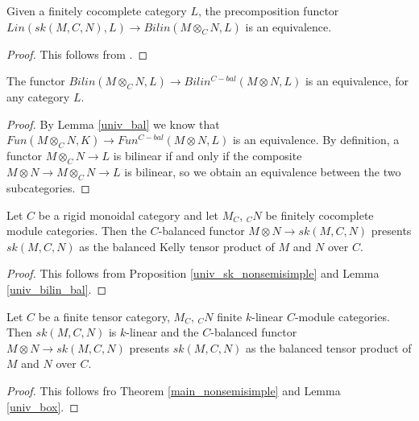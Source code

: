  
\begin{proposition}\label{univ_sk_nonsemisimple}
Given a finitely cocomplete category $L$, the precomposition functor $Lin(sk(M,C,N),L)\to Bilin(M\otimes_C N, L)$ is an equivalence.\end{proposition}
\begin{proof} This follows from \cite[Theorem 6.23]{kelly/basic-concepts-enriched}.\end{proof}

\begin{lemma}\label{univ_bilin_bal}
The functor $Bilin(M\otimes_C N,L)\to Bilin^{C-bal}(M\otimes N, L)$ is an equivalence, for any category $L$. \end{lemma}
\begin{proof}
By Lemma \ref{univ_bal} we know that $Fun(M\otimes_C N,K)\to Fun^{C-bal}(M\otimes N, L)$ is an equivalence. By definition, a functor $M\otimes_C N\to L$ is bilinear if and only if the composite $M\otimes N\to M\otimes_C N\to L$ is bilinear, so we obtain an equivalence between the two subcategories.\end{proof}

\begin{theorem}\label{main_nonsemisimple}
 Let $C$ be a rigid monoidal category and let $M_C$, $_{C}N$ be finitely cocomplete module categories. Then the $C$-balanced functor $M\otimes N\to sk(M,C,N)$ presents $sk(M,C,N)$ as the balanced Kelly tensor product of $M$ and $N$ over $C$.\end{theorem}
 \begin{proof}
  
This follows from Proposition \ref{univ_sk_nonsemisimple} and Lemma \ref{univ_bilin_bal}.\end{proof}

\begin{corollary}
 
Let $C$ be a finite tensor category, $M_C$, $_{C}N$ finite $k$-linear $C$-module categories. Then $sk(M,C,N)$ is $k$-linear and the $C$-balanced functor $M\otimes N\to sk(M,C,N)$ presents $sk(M,C,N)$ as the balanced tensor product of $M$ and $N$ over $C$.
\end{corollary}
\begin{proof}
 
This follows fro Theorem \ref{main_nonsemisimple} and Lemma \ref{univ_box}.\end{proof}
  


 
 

